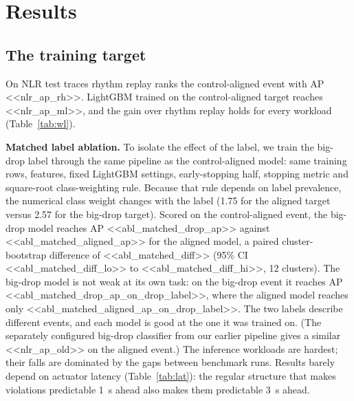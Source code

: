 \documentclass[11pt]{article}
\begin{document}
\section{Results}

\subsection{The training target}
\label{sec:res-target}

On NLR test traces rhythm replay ranks the control-aligned event with AP <<nlr_ap_rh>>. LightGBM trained
on the control-aligned target reaches <<nlr_ap_ml>>, and the gain over rhythm replay holds for every
workload (Table~\ref{tab:wl}).

\textbf{Matched label ablation.} To isolate the effect of the label, we train the big-drop label through
the same pipeline as the control-aligned model: same training rows, features, fixed LightGBM settings,
early-stopping half, stopping metric and square-root class-weighting rule. Because that rule depends on
label prevalence, the numerical class weight changes with the label (1.75 for the aligned target versus 2.57 for the big-drop target). Scored on the control-aligned event, the
big-drop model reaches AP <<abl_matched_drop_ap>> against <<abl_matched_aligned_ap>> for the aligned model,
a paired cluster-bootstrap difference of <<abl_matched_diff>> (95\% CI <<abl_matched_diff_lo>> to
<<abl_matched_diff_hi>>, 12 clusters). The big-drop model is not weak at its own task: on the big-drop
event it reaches AP <<abl_matched_drop_ap_on_drop_label>>, where the aligned model reaches only
<<abl_matched_aligned_ap_on_drop_label>>. The two labels describe different events, and each model is good
at the one it was trained on. (The separately configured big-drop classifier from our earlier pipeline
gives a similar <<nlr_ap_old>> on the aligned event.)
The inference workloads are hardest; their falls are dominated by the gaps between benchmark runs.
Results barely depend on actuator latency (Table~\ref{tab:lat}): the regular structure that makes
violations predictable 1~s ahead also makes them predictable 3~s ahead.
\end{document}
